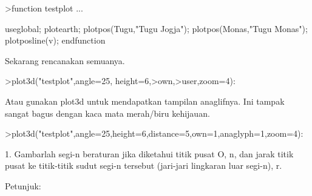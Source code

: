 \documentclass[a4paper,10pt]{article}
\begin{document}
\begin{eulernotebook}
\begin{eulercomment}
\begin{eulercomment}
\begin{eulercomment}
\begin{eulercomment}
\begin{eulercomment}
\begin{eulercomment}
\begin{eulercomment}
\begin{eulercomment}
\begin{eulercomment}
\begin{eulercomment}
\begin{eulercomment}
\begin{eulercomment}
\begin{eulercomment}
\begin{eulercomment}
\begin{eulercomment}
\begin{eulercomment}
\begin{eulercomment}
\begin{eulercomment}
\begin{eulercomment}
\begin{eulercomment}
\begin{eulercomment}
\begin{eulercomment}
\begin{eulercomment}
\begin{eulercomment}
\begin{eulercomment}
\begin{eulercomment}
\begin{eulercomment}
\begin{eulercomment}
\begin{eulercomment}
\begin{eulercomment}
\begin{eulercomment}
\begin{eulercomment}
\begin{eulercomment}
\begin{eulercomment}
\begin{eulerprompt}
>function testplot ...
\end{eulerprompt}
\begin{eulerudf}
  useglobal;
  plotearth;
  plotpos(Tugu,"Tugu Jogja"); plotpos(Monas,"Tugu Monas");
  plotposline(v);
  endfunction
\end{eulerudf}
\begin{eulercomment}
Sekarang rencanakan semuanya.
\end{eulercomment}
\begin{eulerprompt}
>plot3d("testplot",angle=25, height=6,>own,>user,zoom=4):
\end{eulerprompt}
\begin{eulercomment}
Atau gunakan plot3d untuk mendapatkan tampilan anaglifnya. Ini tampak
sangat bagus dengan kaca mata merah/biru kehijauan.
\end{eulercomment}
\begin{eulerprompt}
>plot3d("testplot",angle=25,height=6,distance=5,own=1,anaglyph=1,zoom=4):
\end{eulerprompt}
\begin{eulercomment}
1. Gambarlah segi-n beraturan jika diketahui titik pusat O, n, dan jarak titik pusat ke
titik-titik sudut segi-n tersebut (jari-jari lingkaran luar segi-n), r.

Petunjuk:


\end{eulercomment}
\end{eulercomment}
\end{eulercomment}
\end{eulercomment}
\end{eulercomment}
\end{eulercomment}
\end{eulercomment}
\end{eulercomment}
\end{eulercomment}
\end{eulercomment}
\end{eulercomment}
\end{eulercomment}
\end{eulercomment}
\end{eulercomment}
\end{eulercomment}
\end{eulercomment}
\end{eulercomment}
\end{eulercomment}
\end{eulercomment}
\end{eulercomment}
\end{eulercomment}
\end{eulercomment}
\end{eulercomment}
\end{eulercomment}
\end{eulercomment}
\end{eulercomment}
\end{eulercomment}
\end{eulercomment}
\end{eulercomment}
\end{eulercomment}
\end{eulercomment}
\end{eulercomment}
\end{eulercomment}
\end{eulercomment}
\end{eulercomment}
\end{eulernotebook}
\end{document}
